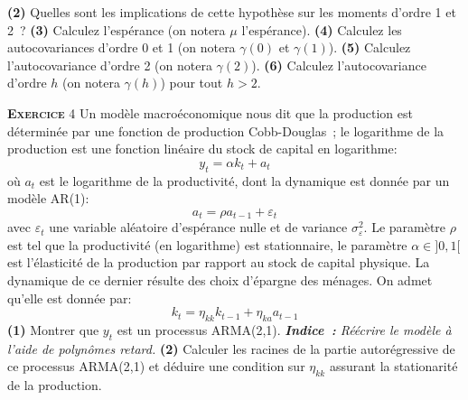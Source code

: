 \documentclass[10pt,a4paper,notitlepage,twocolumn]{article}
\newcommand{\exercice}[1]{\textsc{\textbf{Exercice}} #1}
\newcommand{\question}[1]{\textbf{(#1)}}
\begin{document}
\question{2} Quelles sont les implications de cette hypothèse sur les
moments d'ordre 1 et 2 ? \question{3} Calculez l'espérance (on notera
$\mu$ l'espérance). \question{4} Calculez les autocovariances d'ordre
0 et 1 (on notera $\gamma(0)$ et $\gamma(1)$). \question{5} Calculez
l'autocovariance d'ordre 2 (on notera $\gamma(2)$). \question{6}
Calculez l'autocovariance d'ordre $h$ (on notera $\gamma(h)$) pour tout
$h>2$.

\bigskip
\bigskip

\exercice{4} Un modèle macroéconomique nous dit que la production est
déterminée par une fonction de production Cobb-Douglas ; le logarithme
de la production est une fonction linéaire du stock de
capital en logarithme:
\[
y_t = \alpha k_{t} + a_t
\]
où $a_t$ est le logarithme de la productivité, dont la dynamique est
donnée par un modèle AR(1):
\[
a_t = \rho a_{t-1} + \varepsilon_t
\]
avec $\varepsilon_t$ une variable aléatoire d'espérance nulle et de
variance $\sigma_{\varepsilon}^2$. Le paramètre $\rho$ est tel que la
productivité (en logarithme) est stationnaire, le paramètre
$\alpha\in]0,1[$ est l'élasticité de la production par rapport au
stock de capital physique. La dynamique de ce dernier résulte des
choix d'épargne des ménages. On admet qu'elle est donnée par:
\[
k_t = \eta_{kk} k_{t-1} + \eta_{ka}a_{t-1}
\]
\question{1} Montrer que $y_t$ est un processus ARMA(2,1).
\emph{\textbf{Indice :} Réécrire le modèle à l'aide de polynômes retard.}
\question{2} Calculer les racines de la partie autorégressive de ce processus
ARMA(2,1) et déduire une condition sur $\eta_{kk}$ assurant la stationarité de
la production.
\end{document}

